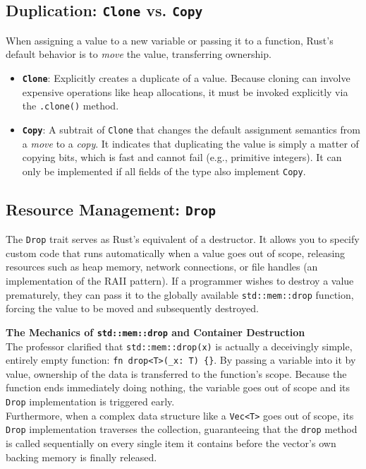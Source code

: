 \subsection*{Duplication: \texttt{Clone} vs. \texttt{Copy}}
When assigning a value to a new variable or passing it to a function, Rust's default behavior is to \textit{move} the value, transferring ownership.
\begin{itemize}
    \item \textbf{\texttt{Clone}}: Explicitly creates a duplicate of a value. Because cloning can involve expensive operations like heap allocations, it must be invoked explicitly via the \texttt{.clone()} method.
    \item \textbf{\texttt{Copy}}: A subtrait of \texttt{Clone} that changes the default assignment semantics from a \textit{move} to a \textit{copy}. It indicates that duplicating the value is simply a matter of copying bits, which is fast and cannot fail (e.g., primitive integers). It can only be implemented if all fields of the type also implement \texttt{Copy}.
\end{itemize}

\subsection*{Resource Management: \texttt{Drop}}
The \texttt{Drop} trait serves as Rust's equivalent of a destructor. It allows you to specify custom code that runs automatically when a value goes out of scope, releasing resources such as heap memory, network connections, or file handles (an implementation of the RAII pattern). 
If a programmer wishes to destroy a value prematurely, they can pass it to the globally available \texttt{std::mem::drop} function, forcing the value to be moved and subsequently destroyed.

\begin{memoryblock}
\textbf{The Mechanics of \texttt{std::mem::drop} and Container Destruction} \\
The professor clarified that \texttt{std::mem::drop(x)} is actually a deceivingly simple, entirely empty function: \texttt{fn drop<T>(\_x: T) \{\}}. By passing a variable into it by value, ownership of the data is transferred to the function's scope. Because the function ends immediately doing nothing, the variable goes out of scope and its \texttt{Drop} implementation is triggered early. \\
Furthermore, when a complex data structure like a \texttt{Vec<T>} goes out of scope, its \texttt{Drop} implementation traverses the collection, guaranteeing that the \texttt{drop} method is called sequentially on every single item it contains before the vector's own backing memory is finally released.
\end{memoryblock}

